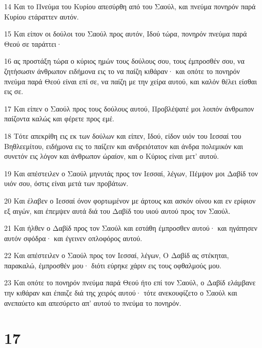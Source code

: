 \par 14 Και το Πνεύμα του Κυρίου απεσύρθη από του Σαούλ, και πνεύμα πονηρόν παρά Κυρίου ετάραττεν αυτόν.
\par 15 Και είπον οι δούλοι του Σαούλ προς αυτόν, Ιδού τώρα, πονηρόν πνεύμα παρά Θεού σε ταράττει·
\par 16 ας προστάξη τώρα ο κύριος ημών τους δούλους σου, τους έμπροσθέν σου, να ζητήσωσιν άνθρωπον ειδήμονα εις το να παίζη κιθάραν· και οπότε το πονηρόν πνεύμα παρά Θεού είναι επί σε, να παίζη με την χείρα αυτού, και καλόν θέλει είσθαι εις σε.
\par 17 Και είπεν ο Σαούλ προς τους δούλους αυτού, Προβλέψατέ μοι λοιπόν άνθρωπον παίζοντα καλώς και φέρετε προς εμέ.
\par 18 Τότε απεκρίθη εις εκ των δούλων και είπεν, Ιδού, είδον υιόν του Ιεσσαί του Βηθλεεμίτου, ειδήμονα εις το παίζειν και ανδρειότατον και άνδρα πολεμικόν και συνετόν εις λόγον και άνθρωπον ώραίον, και ο Κύριος είναι μετ' αυτού.
\par 19 Και απέστειλεν ο Σαούλ μηνυτάς προς τον Ιεσσαί, λέγων, Πέμψον μοι Δαβίδ τον υιόν σου, όστις είναι μετά των προβάτων.
\par 20 Και έλαβεν ο Ιεσσαί όνον φορτωμένον με άρτους και ασκόν οίνου και εν ερίφιον εξ αιγών, και έπεμψεν αυτά διά του Δαβίδ του υιού αυτού προς τον Σαούλ.
\par 21 Και ήλθεν ο Δαβίδ προς τον Σαούλ και εστάθη έμπροσθεν αυτού· και ηγάπησεν αυτόν σφόδρα· και έγεινεν οπλοφόρος αυτού.
\par 22 Και απέστειλεν ο Σαούλ προς τον Ιεσσαί, λέγων, Ο Δαβίδ ας στέκηται, παρακαλώ, έμπροσθέν μου· διότι εύρηκε χάριν εις τους οφθαλμούς μου.
\par 23 Και οπότε το πονηρόν πνεύμα παρά Θεού ήτο επί τον Σαούλ, ο Δαβίδ ελάμβανε την κιθάραν και έπαιζε διά της χειρός αυτού· τότε ανεκουφίζετο ο Σαούλ και ανεπαύετο και απεσύρετο απ' αυτού το πνεύμα το πονηρόν.

\chapter{17}

